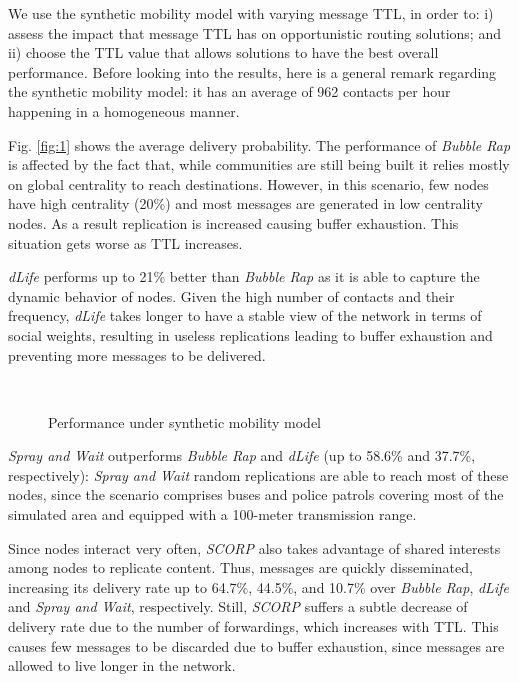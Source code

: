 \documentclass[lnicst]{svmultln}
\begin{document}
We use the synthetic mobility model with varying message TTL, in order
to: i) assess the impact that message TTL has on opportunistic routing
solutions; and ii) choose the TTL value that allows solutions to have
the best overall performance\emph{. }Before looking into the results,
here is a general remark regarding the synthetic mobility model: it
has an average of 962 contacts per hour happening in a homogeneous
manner.

Fig. \ref{fig:1} shows the average delivery probability. The performance
of \emph{Bubble Rap} is affected by the fact that, while communities
are still being built it relies mostly on global centrality to reach
destinations. However, in this scenario, few nodes have high centrality
(20\%) and most messages are generated in low centrality nodes. As
a result replication is increased causing buffer exhaustion. This
situation gets worse as TTL increases.

\emph{dLife} performs up to 21\% better than \emph{Bubble Rap }as
it is able to capture the dynamic behavior of nodes. Given the high
number of contacts and their frequency, \emph{dLife} takes longer
to have a stable view of the network in terms of social weights, resulting
in useless replications leading to buffer exhaustion and preventing
more messages to be delivered.

\begin{figure}
\vspace{-0.4cm}
~~~
\vspace{-0.3cm}
\caption{Performance under synthetic mobility model}
\vspace{-0.4cm}
\end{figure}

\emph{Spray and Wait} outperforms \emph{Bubble Rap }and \emph{dLife}
(up to 58.6\% and 37.7\%, respectively): \emph{Spray and Wait} random
replications are able to reach most of these nodes, since the scenario
comprises buses and police patrols covering most of the simulated
area and equipped with a 100-meter transmission range. 

Since nodes interact very often, \emph{SCORP} also takes advantage
of shared interests among nodes to replicate content. Thus, messages
are quickly disseminated, increasing its delivery rate up to 64.7\%,
44.5\%, and 10.7\% over \emph{Bubble Rap}, \emph{dLife} and \emph{Spray
and Wait}, respectively. Still, \emph{SCORP} suffers a subtle decrease
of delivery rate due to the number of forwardings, which increases
with TTL. This causes few messages to be discarded due to buffer exhaustion,
since messages are allowed to live longer in the network.
\end{document}
